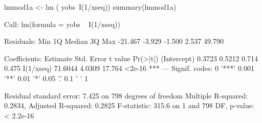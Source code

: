 \begin{Schunk}
\begin{Sinput}
 lmmod1a <- lm ( yobs~I(1/xseq))
 summary(lmmod1a)
\end{Sinput}
\begin{Soutput}
Call:
lm(formula = yobs ~ I(1/xseq))

Residuals:
    Min      1Q  Median      3Q     Max 
-21.467  -3.929  -1.500   2.537  49.790 

Coefficients:
            Estimate Std. Error t value Pr(>|t|)    
(Intercept)   0.3723     0.5212   0.714    0.475    
I(1/xseq)    71.6044     4.0309  17.764   <2e-16 ***
---
Signif. codes:  0 '***' 0.001 '**' 0.01 '*' 0.05 '.' 0.1 ' ' 1

Residual standard error: 7.425 on 798 degrees of freedom
Multiple R-squared:  0.2834,	Adjusted R-squared:  0.2825 
F-statistic: 315.6 on 1 and 798 DF,  p-value: < 2.2e-16
\end{Soutput}
\begin{Sinput}
 
\end{Sinput}
\end{Schunk}
